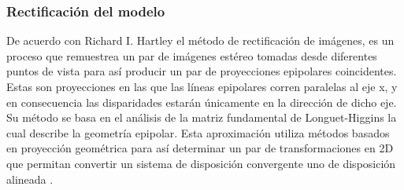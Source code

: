 \subsubsection{Rectificación del modelo}
De acuerdo con Richard I. Hartley el método de rectificación de imágenes, es un proceso que remuestrea un par de imágenes estéreo tomadas desde diferentes puntos de vista para así producir un par de proyecciones epipolares coincidentes. Estas son
proyecciones en las que las líneas epipolares corren paralelas al eje x, y en consecuencia las disparidades estarán únicamente en la dirección de dicho eje. Su método se basa en el análisis de la matriz fundamental de Longuet-Higgins la cual describe la geometría epipolar. Esta aproximación utiliza métodos basados en proyección geométrica para así determinar un par de transformaciones en 2D que permitan convertir un sistema de disposición convergente uno de disposición alineada \cite{Hartley1999}.
